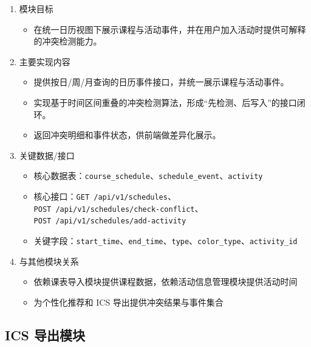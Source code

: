 \documentclass[UTF8,a4paper,12pt,fontset=none]{ctexrep}
\providecommand{\tightlist}{}
\begin{document}
\begin{enumerate}
\def\labelenumi{\arabic{enumi}.}
\item
  模块目标

  \begin{itemize}
  \tightlist
  \item
    在统一日历视图下展示课程与活动事件，并在用户加入活动时提供可解释的冲突检测能力。
  \end{itemize}
\item
  主要实现内容

  \begin{itemize}
  \tightlist
  \item
    提供按日/周/月查询的日历事件接口，并统一展示课程与活动事件。
  \item
    实现基于时间区间重叠的冲突检测算法，形成“先检测、后写入”的接口闭环。
  \item
    返回冲突明细和事件状态，供前端做差异化展示。
  \end{itemize}
\item
  关键数据/接口

  \begin{itemize}
  \tightlist
  \item
    核心数据表：\texttt{course\_schedule}、\texttt{schedule\_event}、\texttt{activity}
  \item
    核心接口：\texttt{GET\ /api/v1/schedules}、\\
    \texttt{POST\ /api/v1/schedules/check-conflict}、\\
    \texttt{POST\ /api/v1/schedules/add-activity}
  \item
    关键字段：\texttt{start\_time}、\texttt{end\_time}、\texttt{type}、\texttt{color\_type}、\texttt{activity\_id}
  \end{itemize}
\item
  与其他模块关系

  \begin{itemize}
  \tightlist
  \item
    依赖课表导入模块提供课程数据，依赖活动信息管理模块提供活动时间
  \item
    为个性化推荐和 ICS 导出提供冲突结果与事件集合
  \end{itemize}
\end{enumerate}

\subsection{ICS 导出模块}\label{ics-ux5bfcux51faux6a21ux5757}
\end{document}
